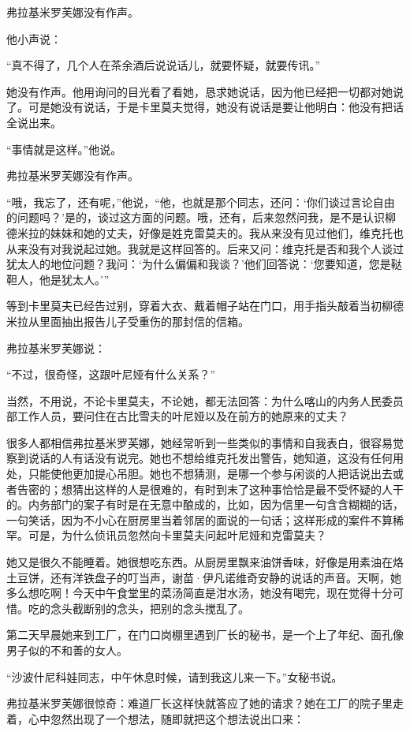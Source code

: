 弗拉基米罗芙娜没有作声。

他小声说：

“真不得了，几个人在茶余酒后说说话儿，就要怀疑，就要传讯。”

她没有作声。他用询问的目光看了看她，恳求她说话，因为他已经把一切都对她说了。可是她没有说话，于是卡里莫夫觉得，她没有说话是要让他明白：他没有把话全说出来。

“事情就是这样。”他说。

弗拉基米罗芙娜没有作声。

“哦，我忘了，还有呢，”他说，“他，也就是那个同志，还问：‘你们谈过言论自由的问题吗？’是的，谈过这方面的问题。哦，还有，后来忽然问我，是不是认识柳德米拉的妹妹和她的丈夫，好像是姓克雷莫夫的。我从来没有见过他们，维克托也从来没有对我说起过她。我就是这样回答的。后来又问：维克托是否和我个人谈过犹太人的地位问题？我问：‘为什么偏偏和我谈？’他们回答说：‘您要知道，您是鞑靼人，他是犹太人。’”

等到卡里莫夫已经告过别，穿着大衣、戴着帽子站在门口，用手指头敲着当初柳德米拉从里面抽出报告儿子受重伤的那封信的信箱。

弗拉基米罗芙娜说：

“不过，很奇怪，这跟叶尼娅有什么关系？”

当然，不用说，不论卡里莫夫，不论她，都无法回答：为什么喀山的内务人民委员部工作人员，要问住在古比雪夫的叶尼娅以及在前方的她原来的丈夫？

很多人都相信弗拉基米罗芙娜，她经常听到一些类似的事情和自我表白，很容易觉察到说话的人有话没有说完。她也不想给维克托发出警告，她知道，这没有任何用处，只能使他更加提心吊胆。她也不想猜测，是哪一个参与闲谈的人把话说出去或者告密的；想猜出这样的人是很难的，有时到末了这种事恰恰是最不受怀疑的人干的。内务部门的案子有时是在无意中酿成的，比如，因为信里一句含含糊糊的话，一句笑话，因为不小心在厨房里当着邻居的面说的一句话；这样形成的案件不算稀罕。可是，为什么侦讯员忽然向卡里莫夫问起叶尼娅和克雷莫夫？

她又是很久不能睡着。她很想吃东西。从厨房里飘来油饼香味，好像是用素油在烙土豆饼，还有洋铁盘子的叮当声，谢苗·伊凡诺维奇安静的说话的声音。天啊，她多么想吃啊！今天中午食堂里的菜汤简直是泔水汤，她没有喝完，现在觉得十分可惜。吃的念头截断别的念头，把别的念头搅乱了。

第二天早晨她来到工厂，在门口岗棚里遇到厂长的秘书，是一个上了年纪、面孔像男子似的不和善的女人。

“沙波什尼科娃同志，中午休息时候，请到我这儿来一下。”女秘书说。

弗拉基米罗芙娜很惊奇：难道厂长这样快就答应了她的请求？她在工厂的院子里走着，心中忽然出现了一个想法，随即就把这个想法说出口来：

